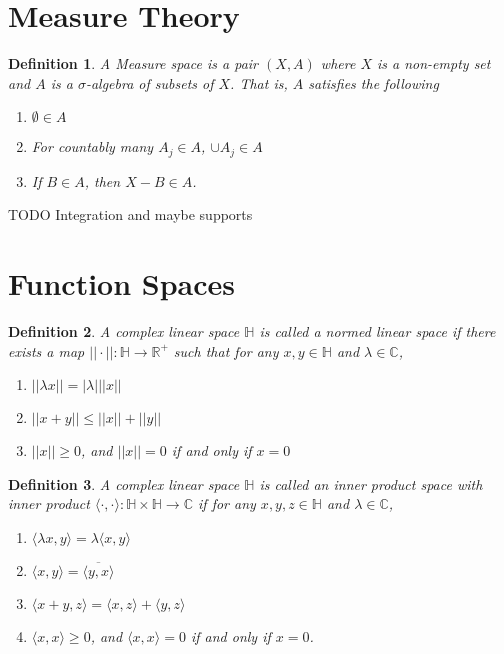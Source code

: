 \documentclass[12pt]{report}
\newtheorem{definition}{Definition}
\numberwithin{definition}{section}
\begin{document}
\break

\section{Measure Theory}

\begin{definition}
  A Measure space is a pair $(X,A)$ where $X$ is a non-empty set and $A$ is a $\sigma$-algebra of subsets of $X$.
  That is, $A$ satisfies the following
  \begin{enumerate}
    \item $\emptyset \in A$
    \item For countably many $A_{j} \in A$, $\cup A_{j} \in A$ 
    \item If $B \in A$, then $X - B \in A$.
  \end{enumerate}
\end{definition}

  TODO Integration and maybe supports
\break

\section{Function Spaces}

\begin{definition}
A complex linear space $\mathbb{H}$ is called a \textit{normed linear space} if there exists a map $|| \cdot || : \mathbb{H} \to \mathbb{R}^{+} $ such that for any $x, y \in \mathbb{H}$ and $ \lambda \in \mathbb{C}$,

\begin{enumerate}
  \item $|| \lambda x || = |\lambda| || x ||$
  \item $|| x + y || \leq || x || + || y ||  $
  \item $|| x || \geq 0$, and $|| x || = 0$ if and only if $x = 0$
\end{enumerate}

\end{definition}

\begin{definition}
  A complex linear space $\mathbb{H}$ is called an inner product space with inner product $ \langle \cdot, \cdot \rangle  : \mathbb{H} \times \mathbb{H} \to \mathbb{C} $ if for any $x,y,z \in \mathbb{H}$ and $\lambda \in \mathbb{C}$,
  \begin{enumerate}
    \item $ \langle \lambda x, y \rangle = \lambda \langle x, y \rangle  $
    \item $ \langle x,y \rangle = \overline{ \langle y,x \rangle }$
    \item $ \langle x + y, z \rangle = \langle x,z \rangle + \langle y,z \rangle $
    \item $ \langle x,x \rangle \geq 0$, and $ \langle x,x \rangle = 0 $ if and only if $x = 0$.
  \end{enumerate}
\end{definition}
\end{document}
